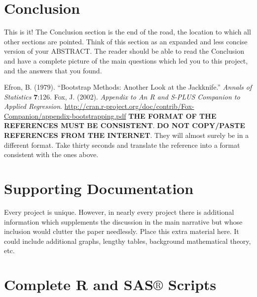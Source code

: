 \documentclass[11pt]{article}
\begin{document}
\newpage

\section[Conclusion]{Conclusion}
\label{sec-6}

This is it! The Conclusion section is the end of the road, the
location to which all other sections are pointed. Think of this
section as an expanded and less concise version of your ABSTRACT.  The
reader should be able to read the Conclusion and have a complete
picture of the main questions which led you to this project, and the
answers that you found.

\newpage{}
\begin{thebibliography}{1}
Efron, B. (1979). \textquotedblleft{}Bootstrap Methods:
Another Look at the Jackknife.\textquotedblright{} \emph{Annals of
Statistics} \textbf{7}:1\textemdash{}26.
Fox, J. (2002). \emph{Appendix to An R and S-PLUS
Companion to Applied Regression}. \url{http://cran.r-project.org/doc/contrib/Fox-Companion/appendix-bootstrapping.pdf}
\textbf{THE FORMAT OF THE REFERENCES MUST BE CONSISTENT}. 
\textbf{DO NOT COPY/PASTE REFERENCES FROM THE INTERNET}.
They will almost surely be in a different format. Take thirty seconds
and translate the reference into a format consistent with the ones
above. 
\newpage{}
\end{thebibliography}
\appendix

\newpage

\section[Supporting Documentation]{Supporting Documentation}
\label{sec-7}

Every project is unique. However, in nearly every project there is
additional information which supplements the discussion in the main
narrative but whose inclusion would clutter the paper
needlessly. Place this extra material here. It could include
additional graphs, lengthy tables, background mathematical theory,
etc.

\newpage

\section[Complete R and SAS\(\circledR\) Scripts]{Complete R and SAS\(\circledR\) Scripts}
\label{sec-8}
\end{document}
